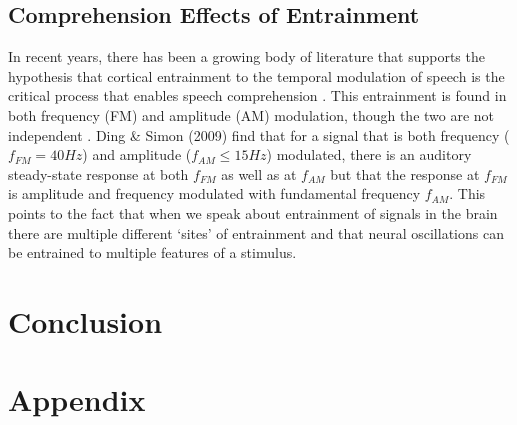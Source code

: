 \documentclass[titlepage]{article}
\begin{document}
  \subsection{Comprehension Effects of Entrainment}

    In recent years, there has been a growing body of literature that supports
    the hypothesis that cortical entrainment to the temporal modulation of
    speech is the critical process that enables speech comprehension
    \cite{Meyer2018,Morillon2015,ZionGolumbic2013,Doelling2014}. This
    entrainment is found in both frequency (FM) and amplitude (AM) modulation,
    though the two are not independent \cite{Ding2009}. Ding \& Simon (2009)
    \cite{Ding2009} find that for a signal that is both frequency
    ($f_{FM}=40Hz$) and amplitude ($f_{AM}\leq 15Hz$) modulated, there is an
    auditory steady-state response at both $f_{FM}$ as well as at $f_{AM}$ but
    that the response at $f_{FM}$ is amplitude and frequency modulated with
    fundamental frequency $f_{AM}$. This points to the fact that when we speak
    about entrainment of signals in the brain there are multiple different
    `sites' of entrainment and that neural oscillations can be entrained to
    multiple features of a stimulus.


\section{Conclusion}

    \blindtext

\appendix
\section{Appendix}

\renewcommand\thefigure{\thesection.\arabic{figure}}    
\setcounter{figure}{0}
\end{document}
